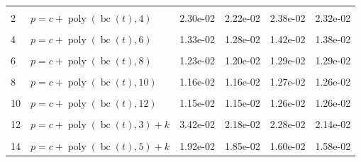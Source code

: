 \documentclass[12pt,a4paper]{article}
\DeclareMathOperator{\bc}{bc}
\DeclareMathOperator{\poly}{poly}
\begin{document}
\begin{longtable}[t]{ll>{\raggedleft\arraybackslash}p{2cm}>{\raggedleft\arraybackslash}p{2cm}>{\raggedleft\arraybackslash}p{2cm}>{\raggedleft\arraybackslash}p{2cm}}
\endfoot
\bottomrule
\endlastfoot
\cellcolor{gray!6}{1} & \cellcolor{gray!6}{$p = c + \poly\left( \bc(t), 3 \right)$} & \cellcolor{gray!6}{3.49e-02} & \cellcolor{gray!6}{2.31e-02} & \cellcolor{gray!6}{2.47e-02} & \cellcolor{gray!6}{2.35e-02}\\
2 & $p = c + \poly\left( \bc(t), 4 \right)$ & 2.30e-02 & 2.22e-02 & 2.38e-02 & 2.32e-02\\
\cellcolor{gray!6}{3} & \cellcolor{gray!6}{$p = c + \poly\left( \bc(t), 5 \right)$} & \cellcolor{gray!6}{2.05e-02} & \cellcolor{gray!6}{2.00e-02} & \cellcolor{gray!6}{1.88e-02} & \cellcolor{gray!6}{1.86e-02}\\
4 & $p = c + \poly\left( \bc(t), 6 \right)$ & 1.33e-02 & 1.28e-02 & 1.42e-02 & 1.38e-02\\
\cellcolor{gray!6}{5} & \cellcolor{gray!6}{$p = c + \poly\left( \bc(t), 7 \right)$} & \cellcolor{gray!6}{1.31e-02} & \cellcolor{gray!6}{1.26e-02} & \cellcolor{gray!6}{1.37e-02} & \cellcolor{gray!6}{1.35e-02}\\
6 & $p = c + \poly\left( \bc(t), 8 \right)$ & 1.23e-02 & 1.20e-02 & 1.29e-02 & 1.29e-02\\
\cellcolor{gray!6}{7} & \cellcolor{gray!6}{$p = c + \poly\left( \bc(t), 9 \right)$} & \cellcolor{gray!6}{1.18e-02} & \cellcolor{gray!6}{1.17e-02} & \cellcolor{gray!6}{1.29e-02} & \cellcolor{gray!6}{1.28e-02}\\
8 & $p = c + \poly\left( \bc(t), 10 \right)$ & 1.16e-02 & 1.16e-02 & 1.27e-02 & 1.26e-02\\
\cellcolor{gray!6}{9} & \cellcolor{gray!6}{$p = c + \poly\left( \bc(t), 11 \right)$} & \cellcolor{gray!6}{1.15e-02} & \cellcolor{gray!6}{1.15e-02} & \cellcolor{gray!6}{1.26e-02} & \cellcolor{gray!6}{1.26e-02}\\
10 & $p = c + \poly\left( \bc(t), 12 \right)$ & 1.15e-02 & 1.15e-02 & 1.26e-02 & 1.26e-02\\
\cellcolor{gray!6}{11} & \cellcolor{gray!6}{$p = c + \poly\left( \bc(t), 13 \right)$} & \cellcolor{gray!6}{1.15e-02} & \cellcolor{gray!6}{1.15e-02} & \cellcolor{gray!6}{1.26e-02} & \cellcolor{gray!6}{1.26e-02}\\
12 & $p = c + \poly\left( \bc(t), 3 \right) + k$ & 3.42e-02 & 2.18e-02 & 2.28e-02 & 2.14e-02\\
\cellcolor{gray!6}{13} & \cellcolor{gray!6}{$p = c + \poly\left( \bc(t), 4 \right) + k$} & \cellcolor{gray!6}{2.18e-02} & \cellcolor{gray!6}{2.08e-02} & \cellcolor{gray!6}{2.17e-02} & \cellcolor{gray!6}{2.10e-02}\\
14 & $p = c + \poly\left( \bc(t), 5 \right) + k$ & 1.92e-02 & 1.85e-02 & 1.60e-02 & 1.58e-02\\

\end{longtable}
\end{document}
